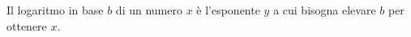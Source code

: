 \documentclass[preview]{standalone}
\begin{document}
\begin{center}
Il logaritmo in base $b$ di un numero $x$ è l'esponente $y$ 
 a cui bisogna elevare $b$ per ottenere $x$.
\end{center}
\end{document}
